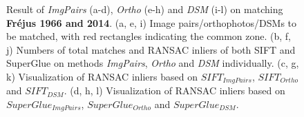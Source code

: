 \begin{figure}[htbp]
\begin{center}
{\begin{minipage}[t]{0.48\linewidth}
            \end{minipage}%
        }
        \caption{{\scriptsize Result of \textit{ImgPairs} (a-d), \textit{Ortho} (e-h) and \textit{DSM} (i-l) on matching \textbf{Fr{\'e}jus 1966 and 2014}. (a, e, i) Image pairs/orthophotos/DSMs to be matched, with red rectangles indicating the common zone. (b, f, j) Numbers of total matches and RANSAC inliers of both SIFT and SuperGlue on methods \textit{ImgPairs}, \textit{Ortho} and \textit{DSM} individually. (c, g, k) Visualization of RANSAC inliers based on $SIFT_{ImgPairs}$, $SIFT_{Ortho}$ and $SIFT_{DSM}$. (d, h, l) Visualization of RANSAC inliers based on $SuperGlue_{ImgPairs}$, $SuperGlue_{Ortho}$ and $SuperGlue_{DSM}$.}}
        \label{MatchVizFrejus1966DSM}
    \end{center}
\end{figure} 



